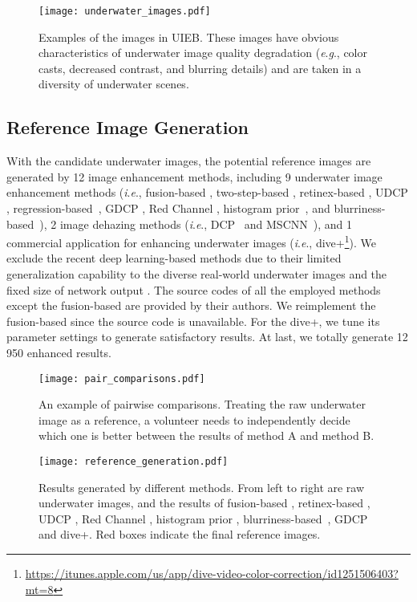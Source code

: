 \documentclass[journal]{IEEEtran}
\newcommand{\ie}{\textit{i}.\textit{e}.}
\newcommand{\eg}{\textit{e}.\textit{g}.}
\begin{document}
\begin{figure}[!htb]
\centering
\texttt{[image: underwater\_images.pdf]}
\caption{Examples of the images in UIEB. These images have obvious characteristics of underwater image quality degradation (\eg, color casts, decreased contrast, and blurring details) and are taken in a diversity of underwater scenes.}
\label{fig_2}
\end{figure}



\subsection{Reference Image Generation}



With the candidate underwater images, the potential reference images are generated by 12 image enhancement methods, including 9 underwater image enhancement methods (\ie, fusion-based \cite{Ancuti2012}, two-step-based \cite{Fu2017}, retinex-based \cite{Fu2014}, UDCP \cite{Drews2016}, regression-based~\cite{Li2017prl}, GDCP \cite{Peng2018}, Red Channel \cite{Galdran2015}, histogram prior~\cite{Li2016}, and blurriness-based~\cite{Peng2017}), 2 image dehazing methods (\ie, DCP~\cite{He2011} and MSCNN~\cite{Ren2016}), and 1 commercial application for enhancing underwater images (\ie, dive+\footnote[8]{\url{https://itunes.apple.com/us/app/dive-video-color-correction/id1251506403?mt=8}}). We exclude the recent deep learning-based methods due to their limited generalization capability to the diverse real-world underwater images and the fixed size of network output \cite{Emerging,Guo2019}. The source codes of all the employed methods except the fusion-based \cite{Ancuti2012} are provided by their authors. We reimplement the fusion-based \cite{Ancuti2012} since the source code is unavailable. For the dive+, we tune its parameter settings to generate satisfactory results. At last, we totally generate 12  950 enhanced results.


\begin{figure}[!htb]
\centering
\texttt{[image: pair\_comparisons.pdf]}
\caption{An example of pairwise comparisons. Treating the raw underwater image as a reference, a volunteer needs to independently decide which one is better between the results of method A and method B.}
\label{fig_3}
\end{figure}

\begin{figure*}[!htb]
\centering
\texttt{[image: reference\_generation.pdf]}
\caption{Results generated by different methods. From left to right are raw underwater images, and the results of fusion-based \cite{Ancuti2012}, retinex-based \cite{Fu2014}, UDCP \cite{Drews2016}, Red Channel \cite{Galdran2015}, histogram prior \cite{Li2016}, blurriness-based~\cite{Peng2017}, GDCP~\cite{Peng2018} and dive+. Red boxes indicate the final reference images.}
\label{fig_4}
\end{figure*}
\end{document}

